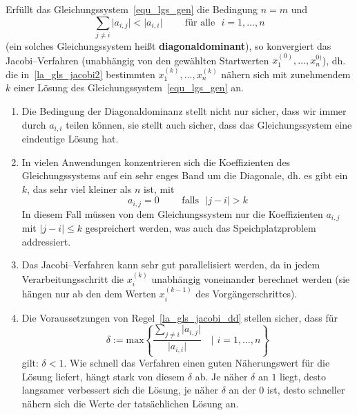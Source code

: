\begin{regel}\label{la_gls_jacobi_dd} 
Erfüllt das Gleichungssystem~\eqref{equ_lgs_gen} die Bedingung $n = m$ und 
	$$ \sum\limits_{j \neq i} \vert a_{i,j} \vert < \vert a_{i,i} \vert \qquad \text{ für alle } \,\, i = 1, \ldots, n $$
(ein solches Gleichungssystem heißt \textbf{diagonaldominant}), so konvergiert das Jacobi--Verfahren  (unabhängig 
von den gewählten Startwerten $x_1^{(0)}, \ldots, x_n^{0)}$), dh. die in~\eqref{la_gls_jacobi2} 
bestimmten $x_1^{(k)}, \ldots, x_n^{(k)}$ nähern sich mit zunehmendem $k$ einer Lösung des 
Gleichungssystem~\eqref{equ_lgs_gen} an. 
\end{regel}

\begin{notiz}\leavevmode\newline
\vspace{-0.6cm}

\begin{enumerate}
\item Die Bedingung der Diagonaldominanz stellt nicht nur sicher, dass wir immer durch $a_{i,i}$ teilen können, sie 
stellt auch sicher, dass das Gleichungssystem eine eindeutige Lösung hat. 
\item In vielen Anwendungen konzentrieren sich die Koeffizienten des Gleichungssystems auf ein sehr enges Band um 
die Diagonale, dh. es gibt ein $k$, das sehr viel kleiner als $n$ ist, mit 
	$$ a_{i,j} = 0 \qquad \text{ falls }\,\, \vert j-i \vert > k $$
In diesem Fall müssen von dem Gleichungssystem nur die Koeffizienten $a_{i,j}$ mit $\vert j - i  \vert \leq k$ gespreichert 
werden, was auch das Speichplatzproblem addressiert.
\item Das Jacobi--Verfahren kann sehr gut parallelisiert werden, da in jedem Verarbeitungsschritt die $x_i^{(k)}$ 
unabhängig voneinander berechnet werden (sie hängen nur ab den dem Werten $x_i^{(k-1)}$ des Vorgängerschrittes). 
\item Die Voraussetzungen von Regel~\ref{la_gls_jacobi_dd} stellen sicher, dass für 
	$$ \delta := \mathrm{max} \left\{ \frac {\sum\limits_{j \neq i} \vert a_{i,j} \vert }{\vert a_{i,i} \vert  }  
	\quad \big\vert \,\, i = 1, \ldots, n \right\} $$
gilt: $\delta < 1$. Wie schnell das Verfahren einen guten Näherungswert für die Lösung liefert, hängt stark von 
diesem $\delta$ ab. Je näher $\delta$ an $1$ liegt, desto langsamer verbessert sich die Lösung, je näher $\delta$ an 
der $0$ ist, desto schneller nähern sich die Werte der tatsächlichen Lösung an. 
\end{enumerate}  
\end{notiz}

